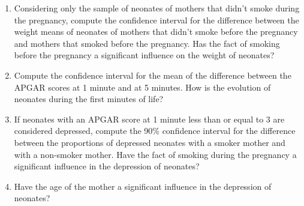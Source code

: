 \begin{enumerate}[leftmargin=*]
\begin{enumerate}
\item Considering only the sample of neonates of mothers that didn't smoke during the pregnancy, compute the confidence
interval for the difference between the weight means of neonates of mothers that didn't smoke before the pregnancy and
mothers that smoked before the pregnancy.
Has the fact of smoking before the pregnancy a significant influence on the weight of neonates? 

\item Compute the confidence interval for the mean of the difference between the APGAR scores at 1 minute and at 5
minutes.
How is the evolution of neonates during the first minutes of life?
\item If neonates with an APGAR score at 1 minute less than or equal to 3 are considered depressed, compute the 90\%
confidence interval for the difference between the proportions of depressed neonates with a smoker mother and with
a non-smoker mother.
Have the fact of smoking during the pregnancy a significant influence in the depression of neonates?
\item Have the age of the mother a significant influence in the depression of neonates?
\end{enumerate}
\end{enumerate}
